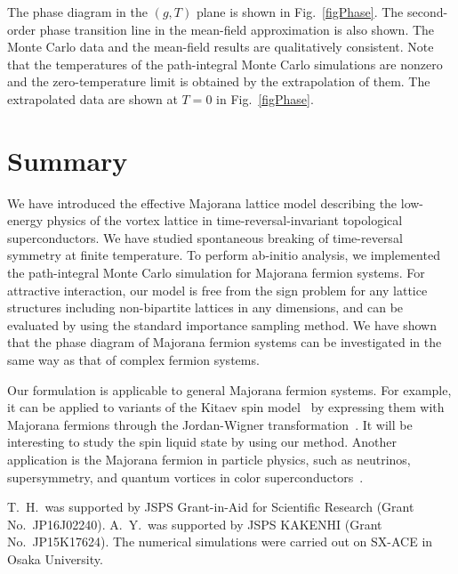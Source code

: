 \documentclass[aps,prb,superscriptaddress,twocolumn]{revtex4-1}
\begin{document}
The phase diagram in the $(g,T)$ plane is shown in Fig.~\ref{figPhase}.
The second-order phase transition line in the mean-field approximation is also shown.
The Monte Carlo data and the mean-field results are qualitatively consistent.
Note that the temperatures of the path-integral Monte Carlo simulations are nonzero and the zero-temperature limit is obtained by the extrapolation of them.
The extrapolated data are shown at $T=0$ in Fig.~\ref{figPhase}.


\section{Summary} 
\label{sec:sum}
We have introduced the effective Majorana lattice model describing the low-energy physics of the vortex lattice in time-reversal-invariant topological superconductors.
We have studied spontaneous breaking of time-reversal symmetry at finite temperature.
To perform ab-initio analysis, we implemented the path-integral Monte Carlo simulation for Majorana fermion systems.
For attractive interaction, our model is free from the sign problem for any lattice structures including non-bipartite lattices in any dimensions, and can be evaluated by using the standard importance sampling method.
We have shown that the phase diagram of Majorana fermion systems can be investigated in the same way as that of complex fermion systems.

Our formulation is applicable to general Majorana fermion systems.
For example, it can be applied to variants of the Kitaev spin model~\cite{Kitaev20062,PhysRevLett.99.247203,PhysRevB.79.024426,PhysRevB.92.115137} by expressing them with Majorana fermions through the Jordan-Wigner transformation~\cite{PhysRevLett.98.087204,PhysRevB.76.193101,PhysRevLett.113.197205}.
It will be interesting to study the spin liquid state by using our method.
Another application is the Majorana fermion in particle physics, such as neutrinos, supersymmetry, and quantum vortices in color superconductors~\cite{Nishida:2010wr,Yasui:2010yw,Eto:2013hoa}.


\begin{acknowledgements}
T.~H.~was supported by JSPS Grant-in-Aid for Scientific Research (Grant No.~JP16J02240).
A.~Y.~was supported by JSPS KAKENHI (Grant No.~JP15K17624).   
The numerical simulations were carried out on SX-ACE in Osaka University.
\end{acknowledgements}


\end{document}
